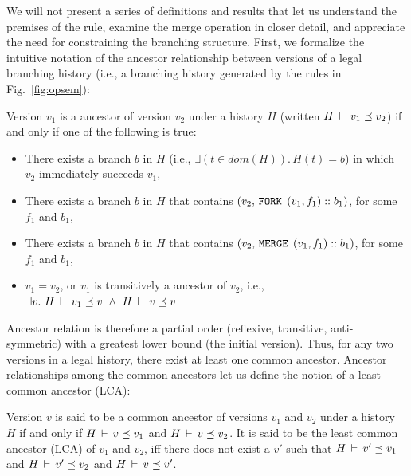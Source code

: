 We will not present a series of definitions and results that let us
understand the premises of the  rule, examine
the merge operation in closer detail, and appreciate the need for
constraining the branching structure. First, we formalize the
intuitive notation of the ancestor relationship between versions of a
legal branching history (i.e., a branching history generated by the
rules in Fig.~\ref{fig:opsem}):

\begin{definition} 
Version $v_1$ is a ancestor of version $v_2$ under a history
$H$ (written $H\,\vdash\,v_1 \preceq v_2$) if and only if one of the
following is true:
\begin{itemize}
  \item There exists a branch $b$ in $H$ (i.e., $\exists(t\in
  dom(H)).\,H(t) = b$) in which $v_2$ immediately succeeds
  $v_1$,
  \item There exists a branch $b$ in $H$ that contains $(v_2, 
  \,{\tt FORK}\,\; (v_1,f_1)::b_1)$, for some $f_1$ and $b_1$,
  \item There exists a branch $b$ in $H$ that contains
  $(v_2, \,{\tt MERGE}\,\;(v_1,f_1)::b_1)$, for some $f_1$ and $b_1$,
  \item $v_1 = v_2$, or $v_1$ is transitively a ancestor of
  $v_2$, i.e., $\exists v.~ H\,\vdash\,v_1 \preceq v ~\wedge~
  H\,\vdash\,v \preceq v$ 
\end{itemize}
\end{definition}

Ancestor relation is therefore a partial order (reflexive, transitive,
anti-symmetric) with a greatest lower bound (the initial version).
Thus, for any two versions in a legal history, there exist at least
one common ancestor. Ancestor relationships among the common ancestors
let us define the notion of a least common ancestor (LCA):

\begin{definition} 
Version $v$ is said to be a common ancestor of versions $v_1$ and
$v_2$ under a history $H$ if and only if $H\,\vdash\,v \preceq v_1$
and $H\,\vdash\,v \preceq v_2$. It is said to be the least common
ancestor (LCA) of $v_1$ and $v_2$, iff there does not exist a $v'$
such that $H\,\vdash\,v' \preceq v_1$ and $H\,\vdash\,v' \preceq v_2$
and $H\,\vdash\,v \preceq v'$.
\end{definition}

